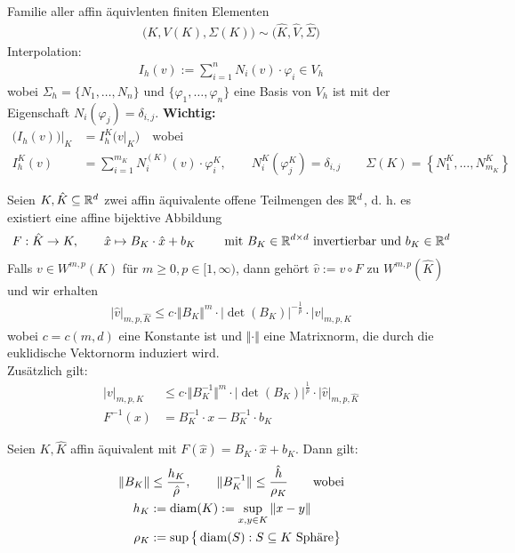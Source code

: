 Familie aller affin äquivlenten finiten Elementen
\begin{align*}
	\big(K,V(K),\Sigma(K)\big)\sim\big(\hat{K},\hat{V},\hat{\Sigma}\big)
\end{align*}
Interpolation:
\begin{align*}
	I_h(v):=\sum\limits_{i=1}^n N_i(v)\cdot\varphi_i\in V_h
\end{align*}
wobei $\Sigma_h=\lbrace N_1,\ldots,N_n\rbrace\text{ und }\lbrace\varphi_1,\ldots,\varphi_n\rbrace$ eine Basis von $V_h$ ist mit der Eigenschaft $N_i(\varphi_j)=\delta_{i,j}$.\nl
\textbf{Wichtig: }
\begin{align*}
	\big(I_h(v)\big)\big|_K&=I_h^K\big(v|_K\big)\quad\text{wobei}\\ I_h^K(v)&=\sum\limits_{i=1}^{m_K} N_i^{(K)}(v)\cdot\varphi_i^K,\qquad N_i^K(\varphi_j^K)=\delta_{i,j}\qquad\Sigma(K)=\left\lbrace N_1^K,\ldots,N_{m_K}^K\right\rbrace
\end{align*}

\begin{theorem}\label{theorem4.9}
	Seien $K,\hat{K}\subseteq\mathbb{R}^d$ zwei affin äquivalente offene  Teilmengen des $\mathbb{R}^d$, d. h. es existiert eine affine bijektive Abbildung
	\begin{align*}
		F:\hat{K}\to K,\qquad \hat{x}\mapsto B_K\cdot\hat{x}+ b_K\qquad\text{ mit } B_K\in\mathbb{R}^{d\times d}\text{ invertierbar und }b_K\in\mathbb{R}^d
	\end{align*}
	Falls $v\in W^{m,p}(K)$ für $m\geq0,p\in[1,\infty)$, dann gehört $\hat{v}:=v\circ F$ zu $W^{m,p}(\hat{K})$ und wir erhalten
	\begin{align*}
		\big|\hat{v}\big|_{m,p,\hat{K}}\leq c\cdot\Vert B_K\Vert^m\cdot\big|\det(B_K)\big|^{-\frac{1}{p}}\cdot|v|_{m,p,K}
	\end{align*}
	wobei $c=c(m,d)$ eine Konstante ist und $\Vert\cdot\Vert$ eine Matrixnorm, die durch die euklidische Vektornorm induziert wird.\\
	Zusätzlich gilt:
	\begin{align*}
		|v|_{m,p,K}&\leq c\cdot\Vert B_K^{-1}\Vert^m\cdot\big|\det(B_K)\big|^{\frac{1}{p}}\cdot|\hat{v}|_{m,p,\hat{K}}\\
		F^{-1}(x)&=B_K^{-1}\cdot x-B_K^{-1}\cdot b_K
	\end{align*}
\end{theorem}

\begin{lemma}\label{lemma4.10}
	Seien $K,\hat{K}$ affin äquivalent mit $F(\hat{x})=B_K\cdot\hat{x}+b_K$. Dann gilt:
	\begin{align*}
		\Vert B_K\Vert&\leq\frac{h_K}{\hat{\rho}},\qquad\Vert B_K^{-1}\Vert\leq\frac{\hat{h}}{\rho_K}\qquad\text{wobei}\\
		h_K&:=\operatorname{diam}(K):=\sup\limits_{x,y\in K}\Vert x-y\Vert\\
		\rho_K&:=\sup\big\lbrace\operatorname{diam}(S):S\subseteq K\text{ Sphäre}\big\rbrace
	\end{align*}
\end{lemma}

